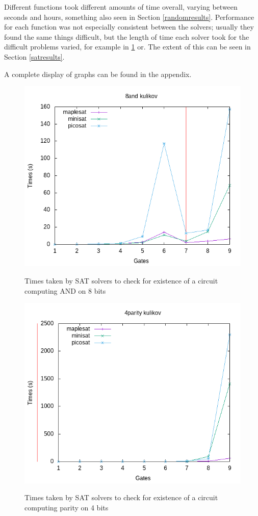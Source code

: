 \documentclass{article}
\begin{document}
Different functions took different amounts of time overall, varying between seconds and hours, something also seen in Section \ref{randomresults}. Performance for each function was not especially consistent between the solvers; usually they found the same things difficult, but the length of time each solver took for the difficult problems varied, for example in \ref{fig:8andkulikov} or. The extent of this can be seen in Section \ref{satresults}.

A complete display of graphs can be found in the appendix.

\begin{figure}[!ht]
  \includegraphics[width=\textwidth]{images/times/8andkulikov.png}
  \label{fig:8andkulikov}
  \caption{Times taken by SAT solvers to check for existence of a circuit computing AND on 8 bits}
\end{figure}

\begin{figure}[!ht]
  \includegraphics[width=\textwidth]{images/times/4paritykulikov.png}
  \label{fig:4paritykulikov}
  \caption{Times taken by SAT solvers to check for existence of a circuit computing parity on 4 bits}
\end{figure}
\end{document}
